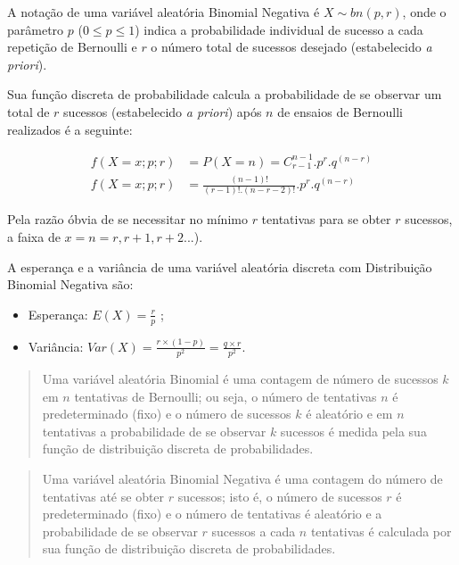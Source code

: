 \documentclass[
]{book}
\providecommand{\tightlist}{%
  \setlength{\itemsep}{0pt}\setlength{\parskip}{0pt}}
\begin{document}
\hfill\break

A notação de uma variável aleatória Binomial Negativa é \(X\sim bn(p,r)\), onde o parâmetro \(p\) (\(0 \le p \le1\)) indica a probabilidade individual de sucesso a cada repetição de Bernoulli e \(r\) o número total de sucessos desejado (estabelecido \emph{a priori}).

\hfill\break

Sua função discreta de probabilidade calcula a probabilidade de se observar um total de \(r\) sucessos (estabelecido \emph{a priori}) após \(n\) de ensaios de Bernoulli realizados é a seguinte:

\begin{align*}
f(X=x; p; r) & = P(X=n) = {C}_{r-1}^{n-1} . {p}^{r} . {q}^{(n-r)} \\
f(X=x; p; r) & = \frac{(n-1)!}{ (r-1)!. (n-r-2)!} . {p}^{r}. {q}^{(n-r)}
\end{align*}

Pela razão óbvia de se necessitar no mínimo \(r\) tentativas para se obter \(r\) sucessos, a faixa de \(x=n={r, r+1, r+2 ...}\)).

\hfill\break

A esperança e a variância de uma variável aleatória discreta com Distribuição Binomial Negativa são:

\begin{itemize}
\tightlist
\item
  Esperança: \(E(X) = \frac{r}{p}\) ;\\
\item
  Variância: \(Var(X) = \frac{r \times (1-p)}{p^{2}} = \frac{q \times r}{p^{2}}\).
\end{itemize}

\hfill\break

\begin{quote}
Uma variável aleatória Binomial é uma contagem de número de sucessos \(k\) em \(n\) tentativas de Bernoulli; ou seja, o número de tentativas \(n\) é predeterminado (fixo) e o número de sucessos \(k\) é aleatório e em \(n\) tentativas a probabilidade de se observar \(k\) sucessos é medida pela sua função de distribuição discreta de probabilidades.
\end{quote}

\begin{quote}
Uma variável aleatória Binomial Negativa é uma contagem do número de tentativas até se obter \(r\) sucessos; isto é, o número de sucessos \(r\) é predeterminado (fixo) e o número de tentativas é aleatório e a probabilidade de se observar \(r\) sucessos a cada \(n\) tentativas é calculada por sua função de distribuição discreta de probabilidades.
\end{quote}
\end{document}
